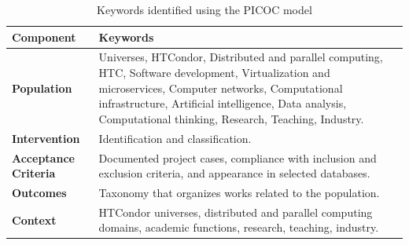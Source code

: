 \begin{table}[htbp]
	\centering
	\caption{Keywords identified using the PICOC model}
	\label{table:picoc_keywords}
	\renewcommand{\arraystretch}{1}  %
	\begin{tabular}{p{1.8cm}p{6cm}}
		\toprule
		\textbf{Component}           & \textbf{Keywords}                                                                                                                                                                                                                                                    \\
		\midrule
		\textbf{Population}          & Universes, HTCondor, Distributed and parallel computing, HTC, Software development, Virtualization and microservices, Computer networks, Computational infrastructure, Artificial intelligence, Data analysis, Computational thinking, Research, Teaching, Industry. \\
		\addlinespace[0.8em]
		\textbf{Intervention}        & Identification and classification.                                                                                                                                                                                                                                   \\
		\addlinespace[0.8em]
		\textbf{Acceptance Criteria} &
		Documented project cases, compliance with inclusion and exclusion criteria, and appearance in selected databases.                                                                                                                                                                                   \\
		\addlinespace[0.8em]
		\textbf{Outcomes}            & Taxonomy that organizes works related to the population.                                                                                                                                                                                                             \\
		\addlinespace[0.8em]
		\textbf{Context}             & HTCondor universes, distributed and parallel computing domains, academic functions, research, teaching, industry.                                                                                                                                                    \\
		\bottomrule
	\end{tabular}
\end{table}


